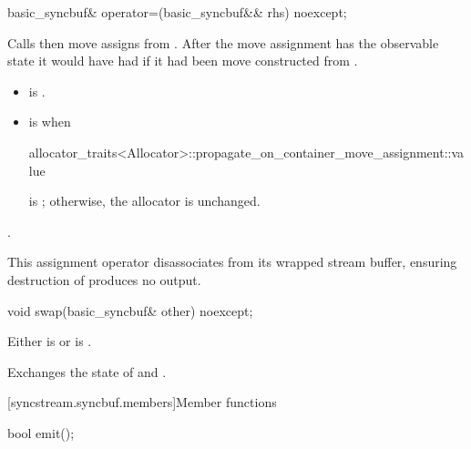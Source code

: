 %
\begin{itemdecl}
basic_syncbuf& operator=(basic_syncbuf&& rhs) noexcept;
\end{itemdecl}

\begin{itemdescr}
\pnum
\effects
Calls  then
move assigns from .
After the move assignment 
has the observable state it would have had if
it had been move constructed from .

\pnum
\ensures
\begin{itemize}
\item
{} is .
\item
{} is  when
\begin{codeblock}
allocator_traits<Allocator>::propagate_on_container_move_assignment::value
\end{codeblock}
is ; otherwise, the allocator is unchanged.
\end{itemize}

\pnum
\returns
{}.

\pnum
\remarks
This assignment operator disassociates 
from its wrapped stream buffer,
ensuring destruction of  produces no output.
\end{itemdescr}

%
\begin{itemdecl}
void swap(basic_syncbuf& other) noexcept;
\end{itemdecl}

\begin{itemdescr}
\pnum
\expects
Either
is 
or
is .

\pnum
\effects
Exchanges the state of  and .
\end{itemdescr}

[syncstream.syncbuf.members]{Member functions}

%
\begin{itemdecl}
bool emit();
\end{itemdecl}

